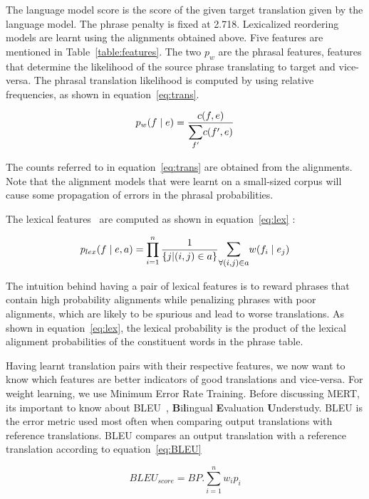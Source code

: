 The language model score is the score of the given target translation given by the language model. The phrase penalty is fixed at 2.718. Lexicalized reordering models are learnt using the alignments obtained above. Five features are mentioned in Table~\ref{table:features}. The two $p_{w}$ are the phrasal features, features that determine the likelihood of the source phrase translating to target and vice-versa. The phrasal translation likelihood is computed by using relative frequencies, as shown in equation~\eqref{eq:trans}. 

\begin{equation} \label{eq:trans}
	p_{w}(f \mid e) = \frac{c(f, e)}{\mathlarger{\sum\limits_{f'}}c(f', e)}
\end{equation}

The counts referred to in equation~\eqref{eq:trans} are obtained from the alignments. Note that the alignment models that were learnt on a small-sized corpus will cause some propagation of errors in the phrasal probabilities. 

The lexical features~\cite{Koehn:03} are computed as shown in equation~\eqref{eq:lex} : 

\begin{equation} \label{eq:lex}
	p_{lex}(f \mid e, a) = \prod\limits_{i=1}^{n} \frac{1}{\{j | (i,j) \in a\}}
	\mathlarger{\sum\limits_{\forall (i,j) \in a}} w(f_{i} \mid e_{j})
\end{equation}


The intuition behind having a pair of lexical features is to reward phrases that contain high probability alignments while penalizing phrases with poor alignments, which are likely to be spurious and lead to worse translations. As shown in equation~\eqref{eq:lex}, the lexical probability is the product of the lexical alignment probabilities of the constituent words in the phrase table. 


Having learnt translation pairs with their respective features, we now want to know which features are better indicators of good translations and vice-versa. For weight learning, we use Minimum Error Rate Training. Before discussing MERT, its important to know about BLEU~\cite{Papineni:02}, \textbf{B}i\textbf{l}ingual \textbf{E}valuation \textbf{U}nderstudy. BLEU is the error metric used most often when comparing output translations with reference translations. BLEU compares an output translation with a reference translation according to equation~\eqref{eq:BLEU}

\begin{equation} \label{eq:BLEU}
	BLEU_{score} = BP. \sum\limits_{i=1}^n w_{i}p_{i}
\end{equation}


